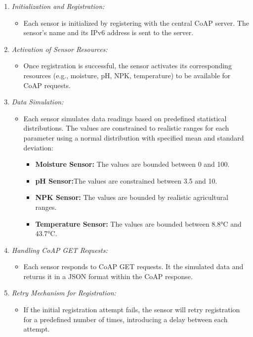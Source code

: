 \begin{enumerate}
    \item \textit{Initialization and Registration:}
    \begin{itemize}
        \item Each sensor is initialized by registering with the central CoAP server. The sensor's name and its IPv6 address is sent to the server.
    \end{itemize}

    \item \textit{Activation of Sensor Resources:}
    \begin{itemize}
        \item Once registration is successful, the sensor activates its corresponding resources (e.g., moisture, pH, NPK, temperature) to be available for CoAP requests.
    \end{itemize}
    
    \item \textit{Data Simulation:}
    \begin{itemize}
        \item Each sensor simulates data readings based on predefined statistical distributions. The values are constrained to realistic ranges for each parameter using a normal distribution with specified mean and standard deviation:
        \begin{itemize}
            \item \textbf{Moisture Sensor:} The values are bounded between 0 and 100.
            \item \textbf{pH Sensor:}The values are constrained between 3.5 and 10.
            \item \textbf{NPK Sensor:} The values are bounded by realistic agricultural ranges.
            \item \textbf{Temperature Sensor:} The values are bounded between 8.8°C and 43.7°C.
        \end{itemize}
    \end{itemize}
    
    \item \textit{Handling CoAP GET Requests:}
    \begin{itemize}
        \item Each sensor responds to CoAP GET requests. It the simulated data and returns it in a JSON format within the CoAP response.
    \end{itemize}

    \item \textit{Retry Mechanism for Registration:}
    \begin{itemize}
        \item If the initial registration attempt fails, the sensor will retry registration for a predefined number of times, introducing a delay between each attempt.
    \end{itemize}


\end{enumerate}
